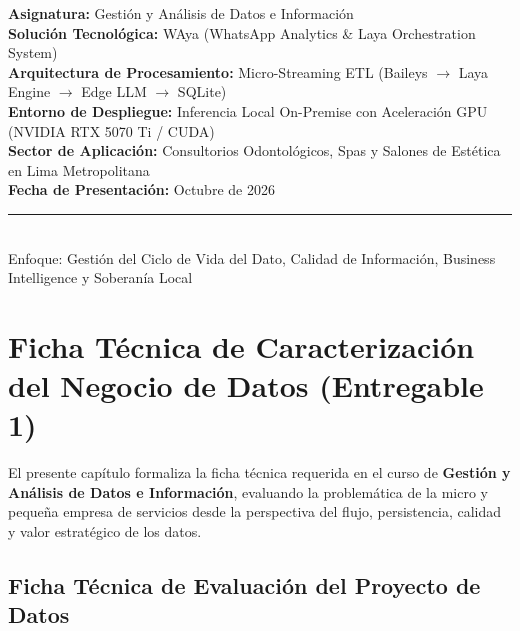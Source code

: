 \documentclass[12pt,a4paper]{report}
\begin{document}
\begin{titlepage}
    \begin{minipage}{0.92\textwidth}
        \begin{flushleft} \normalsize
            \textbf{Asignatura:} Gestión y Análisis de Datos e Información\\
            \textbf{Solución Tecnológica:} WAya (WhatsApp Analytics \& Laya Orchestration System)\\
            \textbf{Arquitectura de Procesamiento:} Micro-Streaming ETL (Baileys $\rightarrow$ Laya Engine $\rightarrow$ Edge LLM $\rightarrow$ SQLite)\\
            \textbf{Entorno de Despliegue:} Inferencia Local On-Premise con Aceleración GPU (NVIDIA RTX 5070 Ti / CUDA)\\
            \textbf{Sector de Aplicación:} Consultorios Odontológicos, Spas y Salones de Estética en Lima Metropolitana\\
            \textbf{Fecha de Presentación:} Octubre de 2026
        \end{flushleft}
    \end{minipage}
    
    \vfill
    \noindent\rule{\textwidth}{0.8pt}\\[0.2cm]
    {\small \textsf{Enfoque: Gestión del Ciclo de Vida del Dato, Calidad de Información, Business Intelligence y Soberanía Local}}
\end{titlepage}

\tableofcontents
\newpage
\listoftables
\newpage
\listoffigures
\newpage

\chapter{Ficha Técnica de Caracterización del Negocio de Datos (Entregable 1)}

El presente capítulo formaliza la ficha técnica requerida en el curso de \textbf{Gestión y Análisis de Datos e Información}, evaluando la problemática de la micro y pequeña empresa de servicios desde la perspectiva del flujo, persistencia, calidad y valor estratégico de los datos.

\section{Ficha Técnica de Evaluación del Proyecto de Datos}
\end{document}
